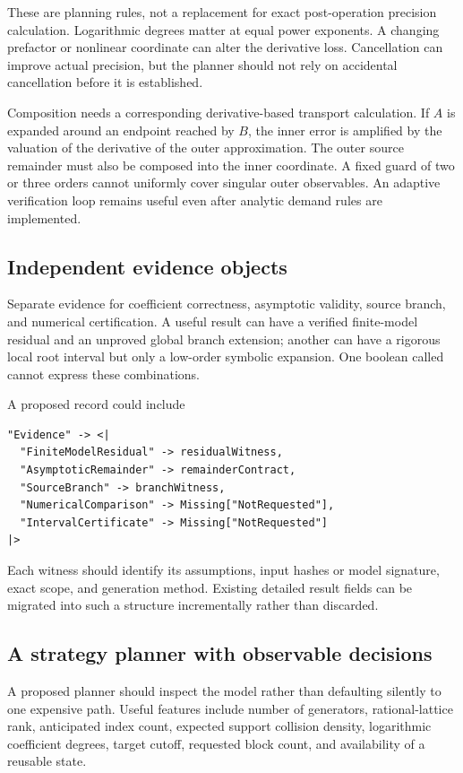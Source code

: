 \documentclass[11pt,a4paper]{article}
\newcommand{\code}[1]{\texttt{\detokenize{#1}}}
\theoremstyle{definition}
\begin{document}
These are planning rules, not a replacement for exact post-operation precision calculation. Logarithmic degrees matter at equal power exponents. A changing prefactor or nonlinear coordinate can alter the derivative loss. Cancellation can improve actual precision, but the planner should not rely on accidental cancellation before it is established.

Composition needs a corresponding derivative-based transport calculation. If $A$ is expanded around an endpoint reached by $B$, the inner error is amplified by the valuation of the derivative of the outer approximation. The outer source remainder must also be composed into the inner coordinate. A fixed guard of two or three orders cannot uniformly cover singular outer observables. An adaptive verification loop remains useful even after analytic demand rules are implemented.

\subsection{Independent evidence objects}

Separate evidence for coefficient correctness, asymptotic validity, source branch, and numerical certification. A useful result can have a verified finite-model residual and an unproved global branch extension; another can have a rigorous local root interval but only a low-order symbolic expansion. One boolean called \code{"Verified"} cannot express these combinations.

A proposed record could include
\begin{lstlisting}
"Evidence" -> <|
  "FiniteModelResidual" -> residualWitness,
  "AsymptoticRemainder" -> remainderContract,
  "SourceBranch" -> branchWitness,
  "NumericalComparison" -> Missing["NotRequested"],
  "IntervalCertificate" -> Missing["NotRequested"]
|>
\end{lstlisting}
Each witness should identify its assumptions, input hashes or model signature, exact scope, and generation method. Existing detailed result fields can be migrated into such a structure incrementally rather than discarded.

\subsection{A strategy planner with observable decisions}

A proposed \code{Method -> Automatic} planner should inspect the model rather than defaulting silently to one expensive path. Useful features include number of generators, rational-lattice rank, anticipated index count, expected support collision density, logarithmic coefficient degrees, target cutoff, requested block count, and availability of a reusable state.
\end{document}
